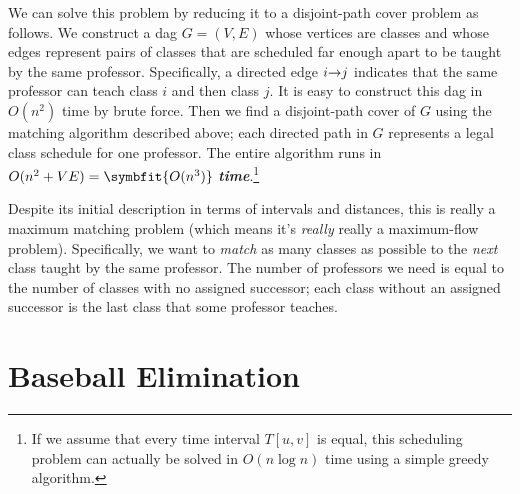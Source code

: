 We can solve this problem by reducing it to a disjoint-path cover problem as follows.
We construct a dag $G = (V,E)$ whose vertices are classes and whose edges represent pairs of classes that are scheduled far enough apart to be taught by the same professor.
Specifically, a directed edge $i\mathord{\rightarrow}j$ indicates that the same professor can teach class $i$ and then class $j$.
It is easy to construct this dag in $O(n^2)$ time by brute force.
Then we find a disjoint-path cover of $G$ using the matching algorithm described above; each directed path in $G$ represents a legal class schedule for one professor.
The entire algorithm runs in $O(n^2 + VE) = \symbfit{O(n^3)}$ \textbf{\textit{time}}.\footnote{If we assume that every time interval $T[u,v]$ is equal,\footnotemark{} this scheduling problem can actually be solved in $O(n \log n)$ time using a simple greedy algorithm.}

Despite its initial description in terms of intervals and distances, this is really a maximum matching problem (which means it’s \textit{really} really a maximum-flow problem).
Specifically, we want to \textit{match} as many classes as possible to the \textit{next} class taught by the same professor.
The number of professors we need is equal to the number of classes with no assigned successor; each class without an assigned successor is the last class that some professor teaches.

\section{Baseball Elimination}
\label{sec:11.6}

